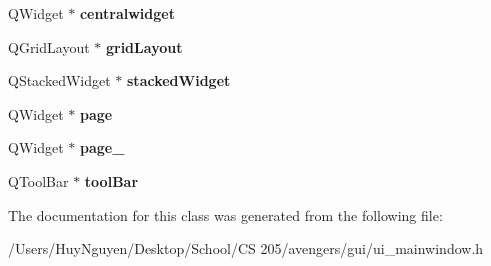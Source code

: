 \begin{DoxyCompactItemize}
\item 
Q\+Widget $\ast$ {\bfseries centralwidget}\hypertarget{classUi__MainWindow_a356f1cf3ebda15f1fac59467ee081b74}{}\label{classUi__MainWindow_a356f1cf3ebda15f1fac59467ee081b74}

\item 
Q\+Grid\+Layout $\ast$ {\bfseries grid\+Layout}\hypertarget{classUi__MainWindow_a525ed3c5fe0784ac502ee222fba4e205}{}\label{classUi__MainWindow_a525ed3c5fe0784ac502ee222fba4e205}

\item 
Q\+Stacked\+Widget $\ast$ {\bfseries stacked\+Widget}\hypertarget{classUi__MainWindow_a8d440a6df1de0bc57afcdda7476d8f19}{}\label{classUi__MainWindow_a8d440a6df1de0bc57afcdda7476d8f19}

\item 
Q\+Widget $\ast$ {\bfseries page}\hypertarget{classUi__MainWindow_ad7d164376bef8649ee1f94697b859417}{}\label{classUi__MainWindow_ad7d164376bef8649ee1f94697b859417}

\item 
Q\+Widget $\ast$ {\bfseries page\+\_}\hypertarget{classUi__MainWindow_adcb6de4cebc6760fe319711f125010cc}{}\label{classUi__MainWindow_adcb6de4cebc6760fe319711f125010cc}

\item 
Q\+Tool\+Bar $\ast$ {\bfseries tool\+Bar}\hypertarget{classUi__MainWindow_ab84dc49349f514d7b7d3fe8e78de069b}{}\label{classUi__MainWindow_ab84dc49349f514d7b7d3fe8e78de069b}

\end{DoxyCompactItemize}


The documentation for this class was generated from the following file\+:\begin{DoxyCompactItemize}
\item 
/\+Users/\+Huy\+Nguyen/\+Desktop/\+School/\+C\+S 205/avengers/gui/ui\+\_\+mainwindow.\+h\end{DoxyCompactItemize}

